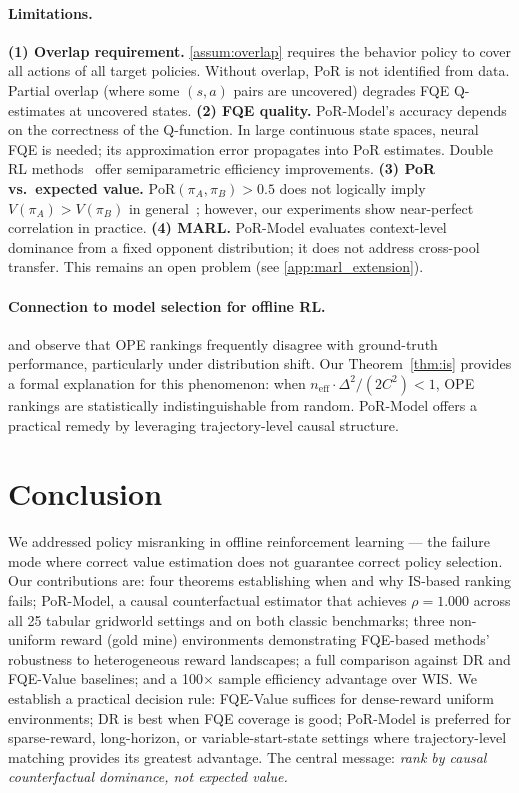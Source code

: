 \documentclass[10pt]{article}
\theoremstyle{plain}
\theoremstyle{definition}
\theoremstyle{remark}
\newcommand{\PoR}{\mathrm{PoR}}
\newcommand{\neff}{n_{\mathrm{eff}}}
\newcommand{\piA}{\pi_A}
\newcommand{\piB}{\pi_B}
\begin{document}
\paragraph{Limitations.}
\textbf{(1) Overlap requirement.}  \cref{assum:overlap} requires the behavior
policy to cover all actions of all target policies.  Without overlap, PoR is
not identified from data.  Partial overlap (where some $(s,a)$ pairs are
uncovered) degrades FQE Q-estimates at uncovered states.
\textbf{(2) FQE quality.}  PoR-Model's accuracy depends on the correctness
of the Q-function.  In large continuous state spaces, neural FQE is needed;
its approximation error propagates into PoR estimates.  Double RL
methods~\citep{kallus2020double} offer semiparametric efficiency improvements.
\textbf{(3) PoR vs.\ expected value.}  $\PoR(\piA,\piB)>0.5$ does not
logically imply $V(\piA)>V(\piB)$ in general~\citep{kawakami2025potential};
however, our experiments show near-perfect correlation in practice.
\textbf{(4) MARL.}  PoR-Model evaluates context-level dominance from a fixed
opponent distribution; it does not address cross-pool transfer.  This
remains an open problem (see \cref{app:marl_extension}).

\paragraph{Connection to model selection for offline RL.}
\citet{paine2020hyperparameter} and \citet{tang2021model} observe that OPE
rankings frequently disagree with ground-truth performance, particularly
under distribution shift.  Our Theorem~\ref{thm:is} provides a formal
explanation for this phenomenon: when $\neff\cdot\Delta^2/(2C^2)<1$, OPE
rankings are statistically indistinguishable from random.  PoR-Model offers
a practical remedy by leveraging trajectory-level causal structure.

\section{Conclusion}
\label{sec:conclusion}

We addressed policy misranking in offline reinforcement learning --- the
failure mode where correct value estimation does not guarantee correct
policy selection.  Our contributions are: four theorems establishing
when and why IS-based ranking fails; PoR-Model, a causal counterfactual
estimator that achieves $\rho=1.000$ across all 25 tabular gridworld
settings and on both classic benchmarks; three non-uniform reward
(gold mine) environments demonstrating FQE-based methods' robustness to
heterogeneous reward landscapes; a full comparison against DR and FQE-Value
baselines; and a 100$\times$ sample efficiency advantage over WIS.
We establish a practical decision rule: FQE-Value suffices for dense-reward
uniform environments; DR is best when FQE coverage is good; PoR-Model
is preferred for sparse-reward, long-horizon, or variable-start-state
settings where trajectory-level matching provides its greatest advantage.
The central message: \emph{rank by causal counterfactual dominance, not
expected value.}
\end{document}
